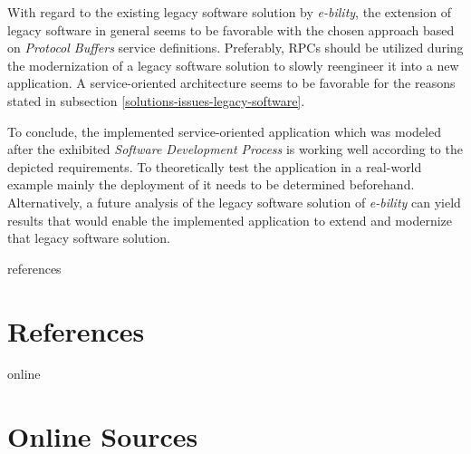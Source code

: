 \documentclass[12pt,a4paper,twoside]{report}
\begin{document}
With regard to the existing legacy software solution by \textit{e-bility},
the extension of legacy software in general seems to be favorable with
the chosen approach based on \textit{Protocol Buffers} service definitions.
Preferably, RPCs should be utilized during the modernization of a
legacy software solution to slowly reengineer it into a new application.
A service-oriented architecture seems to be favorable for the reasons stated
in subsection \ref{solutions-issues-legacy-software}.

To conclude, the implemented service-oriented application which was modeled
after the exhibited \textit{Software Development Process} is working well
according to the depicted requirements.
To theoretically test the application in a real-world example mainly the
deployment of it needs to be determined beforehand.
Alternatively, a future analysis of the legacy software solution of \textit{e-bility}
can yield results that would enable the implemented application to extend
and modernize that legacy software solution.



\newpage

\listoffigures
\newpage


\begin{btSect}{references}
\section*{References}
\btPrintCited
\end{btSect}
\begin{btSect}{online}
\section*{Online Sources}
\btPrintCited
\end{btSect}
\end{document}
